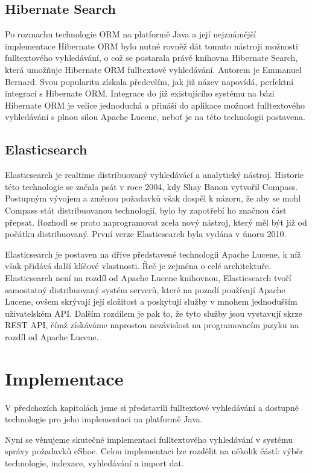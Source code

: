 \documentclass[11pt,draft,oneside]{fithesis2}
\begin{document}
\section{Hibernate Search}
Po rozmachu technologie ORM na platformě Java a její nejznámější implementace Hibernate ORM bylo nutné rovněž dát tomuto nástroji možnosti fulltextového vyhledávání, o což se postarala právě knihovna Hibernate Search, která umožňuje Hibernate ORM fulltextové vyhledávání. Autorem je Emmanuel Bernard. 
Svou popularitu získala především, jak již název napovídá, perfektní integrací s Hibernate ORM. Integrace do již existujícího systému na bázi Hibernate ORM je velice jednoduchá a přináší do aplikace možnost fulltextového vyhledávání s plnou silou Apache Lucene, neboť je na této technologii postavena.

\section{Elasticsearch}
Elasticsearch je realtime distribuovaný vyhledávácí a analytický nástroj. Historie této technologie se začala psát v roce 2004, kdy Shay Banon vytvořil Compass. Postupným vývojem a změnou požadavků však dospěl k názoru, že aby se mohl Compass stát distribuovanou technologií, bylo by zapotřebí ho značnou část přepsat.
Rozhodl se proto naprogramovat zcela nový nástroj, který měl být již od počátku distribuovaný. První verze Elasticsearch byla vydána v únoru 2010.

Elasticsearch je postaven na dříve představené technologii Apache Lucene, k níž však přidává další klíčové vlastnosti. Řeč je zejména o celé architektuře. Elasticsearch není na rozdíl od Apache Lucene knihovnou, Elasticsearch tvoří samostatný distribuovaný systém serverů, které na pozadí používají Apache Lucene, ovšem 
skrývají její složitost a poskytují služby v mnohem jednodušším uživatelském API. Dalším rozdílem je pak to, že tyto služby jsou vystavují skrze REST API, čímž získáváme naprostou nezávislost na programovacím jazyku na rozdíl od Apache Lucene. 

\chapter{Implementace}
V předchozích kapitolách jsme si představili fulltextové vyhledávání a dostupné technologie pro jeho implementaci na platformě Java. 

Nyní se věnujeme skutečné implementaci fulltextového vyhledávání v systému správy požadavků eShoe. Celou implementaci lze rozdělit na několik částí: výběr technologie, indexace, vyhledávání a import dat.
\end{document}
